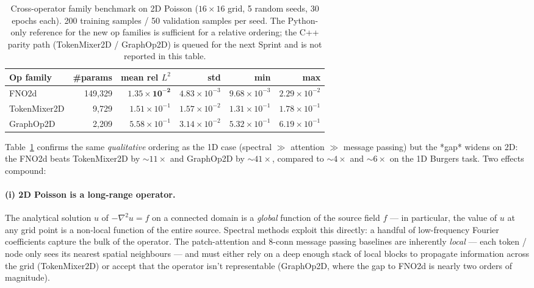 \documentclass[10pt,twocolumn]{article}
\newcommand{\fno}{\textsc{FNO}}
\begin{document}
\begin{table}[t]
  \centering
  \small
  \begin{tabular}{lrrrrr}
    \toprule
    Op family      & \#params  & mean rel $L^2$ & std & min & max \\
    \midrule
    \fno{}2d        & 149{,}329 & $\mathbf{1.35 \times 10^{-2}}$ & $4.83 \times 10^{-3}$ & $9.68 \times 10^{-3}$ & $2.29 \times 10^{-2}$ \\
    TokenMixer2D   &  9{,}729 & $1.51 \times 10^{-1}$            & $1.57 \times 10^{-2}$ & $1.31 \times 10^{-1}$ & $1.78 \times 10^{-1}$ \\
    GraphOp2D      &  2{,}209 & $5.58 \times 10^{-1}$            & $3.14 \times 10^{-2}$ & $5.32 \times 10^{-1}$ & $6.19 \times 10^{-1}$ \\
    \bottomrule
  \end{tabular}
  \caption{Cross-operator family benchmark on 2D Poisson
  ($16 \times 16$ grid, 5 random seeds, 30 epochs each).
  200 training samples / 50 validation samples per seed.
  The Python-only reference for the new op families is
  sufficient for a relative ordering; the C++ parity path
  (TokenMixer2D / GraphOp2D) is queued for the next Sprint
  and is not reported in this table.}
  \label{tab:op-benchmark-2d}
\end{table}

Table~\ref{tab:op-benchmark-2d} confirms the same
\emph{qualitative} ordering as the 1D case (spectral $\gg$
attention $\gg$ message passing) but the *gap* widens on 2D:
the \fno{}2d beats TokenMixer2D by $\sim 11\times$ and
GraphOp2D by $\sim 41\times$, compared to $\sim 4\times$ and
$\sim 6\times$ on the 1D Burgers task.  Two effects compound:

\paragraph{(i) 2D Poisson is a long-range operator.}
The analytical solution $u$ of $-\nabla^2 u = f$ on a
connected domain is a \emph{global} function of the source
field $f$ --- in particular, the value of $u$ at any grid
point is a non-local function of the entire source.  Spectral
methods exploit this directly: a handful of low-frequency
Fourier coefficients capture the bulk of the operator.  The
patch-attention and 8-conn message passing baselines are
inherently \emph{local} --- each token / node only sees its
nearest spatial neighbours --- and must either rely on a
deep enough stack of local blocks to propagate information
across the grid (TokenMixer2D) or accept that the operator
isn't representable (GraphOp2D, where the gap to FNO2d is
nearly two orders of magnitude).
\end{document}
